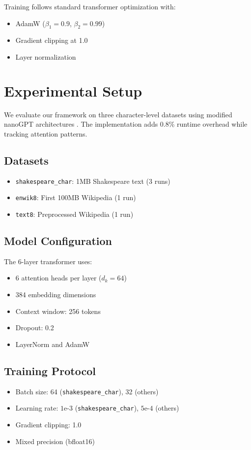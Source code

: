 \documentclass{article} %
\begin{document}
Training follows standard transformer optimization \citep{loshchilov2017adamw} with:
\begin{itemize}
    \item AdamW ($\beta_1=0.9$, $\beta_2=0.99$)
    \item Gradient clipping at 1.0
    \item Layer normalization \citep{ba2016layer}
\end{itemize}

\section{Experimental Setup}
\label{sec:experimental}

We evaluate our framework on three character-level datasets using modified nanoGPT architectures \citep{karpathy2023nanogpt}. The implementation adds 0.8\% runtime overhead while tracking attention patterns.

\subsection{Datasets}
\begin{itemize}
    \item \texttt{shakespeare\_char}: 1MB Shakespeare text (3 runs)
    \item \texttt{enwik8}: First 100MB Wikipedia (1 run)
    \item \texttt{text8}: Preprocessed Wikipedia (1 run)
\end{itemize}

\subsection{Model Configuration}
The 6-layer transformer uses:
\begin{itemize}
    \item 6 attention heads per layer ($d_k=64$)
    \item 384 embedding dimensions
    \item Context window: 256 tokens
    \item Dropout: 0.2
    \item LayerNorm \citep{ba2016layer} and AdamW \citep{loshchilov2017adamw}
\end{itemize}

\subsection{Training Protocol}
\begin{itemize}
    \item Batch size: 64 (\texttt{shakespeare\_char}), 32 (others)
    \item Learning rate: $1\text{e-}3$ (\texttt{shakespeare\_char}), $5\text{e-}4$ (others)
    \item Gradient clipping: 1.0
    \item Mixed precision (bfloat16)
\end{itemize}
\end{document}
